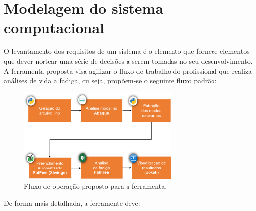 \chapter{Modelagem do sistema computacional}


O levantamento dos requisitos de um sistema é o elemento que fornece elementos que dever nortear uma série de decisões a serem tomadas no seu desenvolvimento. A ferramenta proposta visa agilizar o fluxo de trabalho do profissional que realiza análises de vida a fadiga, ou seja, propõem-se o seguinte fluxo padrão:

\begin{figure}[!ht]
    \centering
    \caption{Fluxo de operação proposto para a ferramenta.}\label{fig:workflow}
    \includegraphics[width=0.7\textwidth]{imagens/workflow}
\end{figure}

De forma mais detalhada, a ferramente deve:

